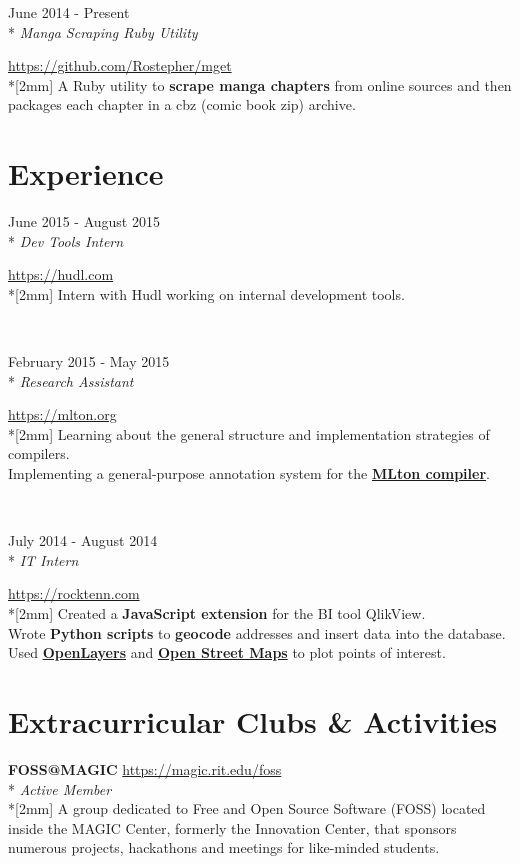 \documentclass[a4paper,margin,line]{resume}
\newcommand{\rvspace}{2mm} %
\newcommand{\rurl}[1]{\hfill {\footnotesize \url{#1}}}
\newcommand{\rdate}[1]{\hfill {\small #1}}
\newcommand{\rdescription}[1]{\small #1 \normalsize}
\newcommand{\ritem}[5] {
    \item[#1]                               %
    \hfill \rdate{#2} \\*                   %
    \hfill {\small \emph{#3}}               %
    \strut \hfill \rurl{#4} \\*[\rvspace]   %
    \rdescription{#5}                       %
}
\newcommand{\remployer}{\ritem}
\newcommand{\rproject}{\ritem}
\newcommand{\rorganization}[4] {
    \item{\bf #1}                           %
    \rurl{#2} \\*                           %
    \hfill {\small \emph{#3}} \\*[\rvspace] %
    \rdescription{#4}                       %
}
\begin{document}
\begin{resume}
\begin{asparadesc}
        \rproject {mget}
                  {June 2014 - Present}
                  {Manga Scraping Ruby Utility}
                  {https://github.com/Rostepher/mget}
        {
            A Ruby utility to {\bf scrape manga chapters} from online sources
            and then packages each chapter in a cbz (comic book zip) archive.
        }
    \end{asparadesc}

\section{\mysidestyle Experience}
	\begin{asparadesc}
        \remployer {Hudl}
                   {June 2015 - August 2015}
                   {Dev Tools Intern}
                   {https://hudl.com}
        {
            Intern with Hudl working on internal development tools.
        }
        \\

        \remployer {Rochester Institute of Technology}
                   {February 2015 - May 2015}
                   {Research Assistant}
                   {https://mlton.org}
        {
            Learning about the general structure and implementation strategies
            of compilers.\\
            Implementing a general-purpose annotation system for the
            \href{https://mlton.org}{\bf MLton compiler}.
        }
        \\

        \remployer {RockTenn}
                   {July 2014 - August 2014}
                   {IT Intern}
                   {https://rocktenn.com}
        {
            Created a {\bf JavaScript extension} for the BI tool QlikView.\\
            Wrote {\bf Python scripts} to {\bf geocode} addresses and insert
            data into the database.\\
            Used \href{https://openlayers.org}{\bf OpenLayers} and
            \href{https://openstreetmap.org}{\bf Open Street Maps} to plot points
            of interest.
	    }
    \end{asparadesc}

\section{\mysidestyle Extracurricular Clubs \& Activities}
	\begin{asparablank}
        \rorganization {FOSS@MAGIC}
                       {https://magic.rit.edu/foss}
                       {Active Member}
        {
            A group dedicated to Free and Open Source Software (FOSS) located
            inside the MAGIC Center, formerly the Innovation Center, that
            sponsors numerous projects, hackathons and meetings for like-minded
            students.
        }
        \\


\end{asparablank}
\end{resume}
\end{document}
